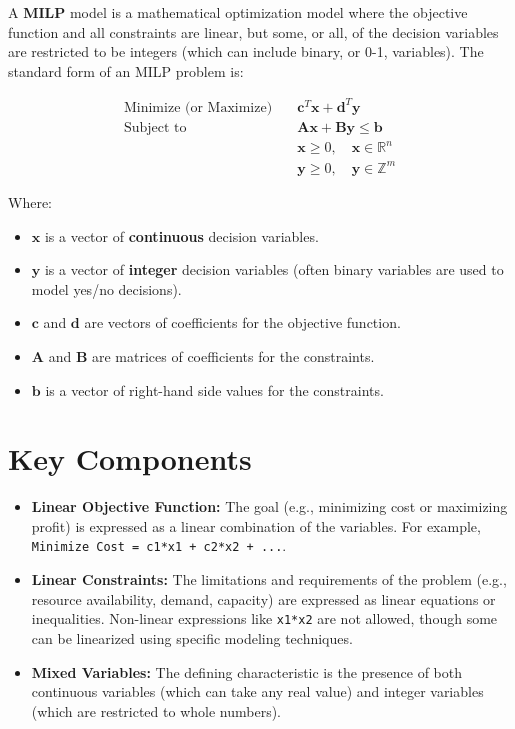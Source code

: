 \documentclass[11pt,a4paper]{report}
\begin{document}
A \textbf{MILP} model is a mathematical optimization model where the objective function and all constraints are linear, but some, or all, of the decision variables are restricted to be integers (which can include binary, or 0-1, variables). The standard form of an MILP problem is:

\begin{equation}
\begin{aligned}
\text{Minimize (or Maximize)} \quad & \mathbf{c}^T\mathbf{x} + \mathbf{d}^T\mathbf{y} \\
\text{Subject to} \quad & \mathbf{A}\mathbf{x} + \mathbf{B}\mathbf{y} \le \mathbf{b} \\
& \mathbf{x} \ge 0, \quad \mathbf{x} \in \mathbb{R}^n \\
& \mathbf{y} \ge 0, \quad \mathbf{y} \in \mathbb{Z}^m
\end{aligned}
\end{equation}

Where:
\begin{itemize}
    \item $\mathbf{x}$ is a vector of \textbf{continuous} decision variables.
    \item $\mathbf{y}$ is a vector of \textbf{integer} decision variables (often binary variables are used to model yes/no decisions).
    \item $\mathbf{c}$ and $\mathbf{d}$ are vectors of coefficients for the objective function.
    \item $\mathbf{A}$ and $\mathbf{B}$ are matrices of coefficients for the constraints.
    \item $\mathbf{b}$ is a vector of right-hand side values for the constraints.
\end{itemize}

\section*{Key Components}

\begin{itemize}
    \item \textbf{Linear Objective Function:} The goal (e.g., minimizing cost or maximizing profit) is expressed as a linear combination of the variables. For example, \texttt{Minimize Cost = c1*x1 + c2*x2 + ...}.
    \item \textbf{Linear Constraints:} The limitations and requirements of the problem (e.g., resource availability, demand, capacity) are expressed as linear equations or inequalities. Non-linear expressions like \texttt{x1*x2} are not allowed, though some can be linearized using specific modeling techniques.
    \item \textbf{Mixed Variables:} The defining characteristic is the presence of both continuous variables (which can take any real value) and integer variables (which are restricted to whole numbers).
\end{itemize}
\end{document}
